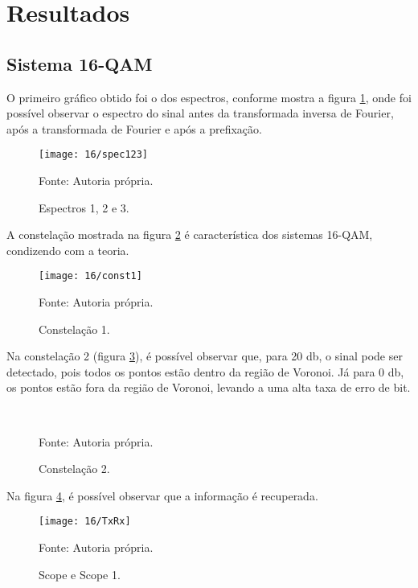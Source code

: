 \newpage
\section{Resultados}

\subsection{Sistema 16-QAM}

O primeiro gráfico obtido foi o dos espectros, conforme mostra a figura \ref{fig:16spec123}, onde foi possível observar o espectro do sinal antes da transformada inversa de Fourier, após a transformada de Fourier e após a prefixação.

\begin{figure}[H]
  \centering
  \caption{Espectros 1, 2 e 3.}
  \texttt{[image: 16/spec123]}
  \label{fig:16spec123}
  
  \small Fonte: Autoria própria.
\end{figure}

A constelação mostrada na figura \ref{fig:16const1} é característica dos sistemas 16-QAM, condizendo com a teoria.

\begin{figure}[H]
  \centering
  \caption{Constelação 1.}
  \texttt{[image: 16/const1]}
  \label{fig:16const1}
  
  \small Fonte: Autoria própria.
\end{figure}

Na constelação 2 (figura \ref{fig:16const2}), é possível observar que, para 20 db, o sinal pode ser detectado, pois todos os pontos estão dentro da região de Voronoi. Já para 0 db, os pontos estão fora da região de Voronoi, levando a uma alta taxa de erro de bit.

\begin{figure}[H]
  \centering
  \caption{Constelação 2.}
  
  \\
  
  
  \label{fig:16const2}
  \small Fonte: Autoria própria.
\end{figure}

Na figura \ref{fig:16TxRx}, é possível observar que a informação é recuperada.

\begin{figure}[H]
  \centering
  \caption{Scope e Scope 1.}
  \texttt{[image: 16/TxRx]}
  \label{fig:16TxRx}
  
  \small Fonte: Autoria própria.
\end{figure}

